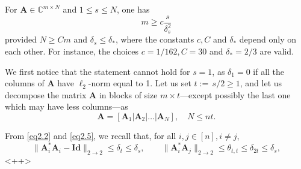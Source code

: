 \begin{theorem}
    \label{th2.8}
    For $\mathbf{A} \in \mathbb{C}^{m \times N}$ and $1 \leq s \leq N$, one has 
    \begin{equation}
        m \geq c \dfrac{s}{\delta_s^2}
        \label{eq2.9}
    \end{equation}
    provided $N \geq Cm$ and $\delta_s \leq \delta_*$, where the constants $c,C$ and $\delta_*$ depend only on each other. For instance, the choices $c = 1/162, C=30$ and $\delta_* = 2/3$ are valid.
\end{theorem}

We first notice that the statement cannot hold for $s=1$, as $\delta_1 = 0$ if all the columns of $\mathbf{A}$ have $\ell_2$-norm equal to 1. Let us set $t := \,s/2\! \geq 1$, and let us decompose the matrix $\mathbf{A}$ in blocks of size $m \times t$---except possibly the last one which may have less columns---as
\[
    \mathbf{A} = \left[ \mathbf{A}_1 | \mathbf{A}_2 | \dots | \mathbf{A}_N \right], \quad N \leq nt.
\]

From \cref{eq2.2} and \cref{eq2.5}, we recall that, for all $i,j \in [n], i \neq j$,
\[
    \|\mathbf{A}^*_i \mathbf{A}_i - \mathbf{Id}\|_{2 \rightarrow 2} \leq \delta_t \leq \delta_s, \qquad \|\mathbf{A}_i^*\mathbf{A}_j\|_{2 \rightarrow 2} \leq \theta_{t,t} \leq \delta_{2t} \leq \delta_s,
\]<++>

















